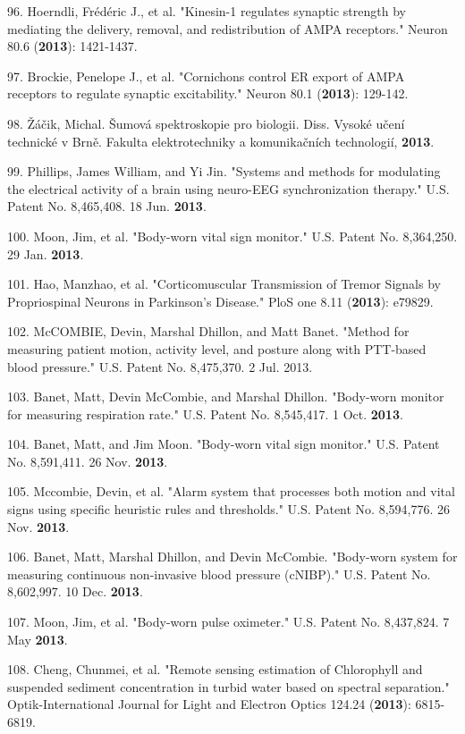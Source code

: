 96. Hoerndli, Fr\'{e}d\'{e}ric J., et al. "Kinesin-1 regulates synaptic strength by mediating the delivery, removal, and redistribution of AMPA receptors." Neuron 80.6 (\textbf{2013}): 1421-1437.

97. Brockie, Penelope J., et al. "Cornichons control ER export of AMPA receptors to regulate synaptic excitability." Neuron 80.1 (\textbf{2013}): 129-142.

98. \v{Z}\'{a}\v{c}ik, Michal. \v{S}umov\'{a} spektroskopie pro biologii. Diss. Vysok\'{e} u\v{c}en\'{i} technick\'{e} v Brn\v{e}. Fakulta elektrotechniky a komunika\v{c}n\'{i}ch technologi\'{i}, \textbf{2013}.

99. Phillips, James William, and Yi Jin. "Systems and methods for modulating the electrical activity of a brain using neuro-EEG synchronization therapy." U.S. Patent No. 8,465,408. 18 Jun. \textbf{2013}.

100. Moon, Jim, et al. "Body-worn vital sign monitor." U.S. Patent No. 8,364,250. 29 Jan. \textbf{2013}.

101. Hao, Manzhao, et al. "Corticomuscular Transmission of Tremor Signals by Propriospinal Neurons in Parkinson's Disease." PloS one 8.11 (\textbf{2013}): e79829.

102. McCOMBIE, Devin, Marshal Dhillon, and Matt Banet. "Method for measuring patient motion, activity level, and posture along with PTT-based blood pressure." U.S. Patent No. 8,475,370. 2 Jul. 2013.

103. Banet, Matt, Devin McCombie, and Marshal Dhillon. "Body-worn monitor for measuring respiration rate." U.S. Patent No. 8,545,417. 1 Oct. \textbf{2013}.

104. Banet, Matt, and Jim Moon. "Body-worn vital sign monitor." U.S. Patent No. 8,591,411. 26 Nov. \textbf{2013}.

105. Mccombie, Devin, et al. "Alarm system that processes both motion and vital signs using specific heuristic rules and thresholds." U.S. Patent No. 8,594,776. 26 Nov. \textbf{2013}.

106. Banet, Matt, Marshal Dhillon, and Devin McCombie. "Body-worn system for measuring continuous non-invasive blood pressure (cNIBP)." U.S. Patent No. 8,602,997. 10 Dec. \textbf{2013}.

107. Moon, Jim, et al. "Body-worn pulse oximeter." U.S. Patent No. 8,437,824. 7 May \textbf{2013}.

108. Cheng, Chunmei, et al. "Remote sensing estimation of Chlorophyll and suspended sediment concentration in turbid water based on spectral separation." Optik-International Journal for Light and Electron Optics 124.24 (\textbf{2013}): 6815-6819.

